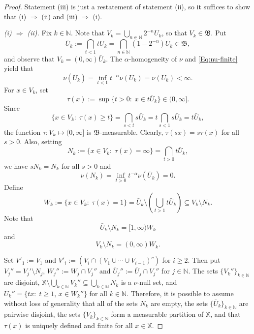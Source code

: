 \documentclass[12pt]{amsart}
\numberwithin{equation}{section}
\numberwithin{figure}{section}
\theoremstyle{plain} \newtheorem{theorem}{Theorem}[section]
\theoremstyle{plain} \newtheorem{proposition}[theorem]{Proposition}
\theoremstyle{plain} \newtheorem{lemma}[theorem]{Lemma}
\theoremstyle{plain} \newtheorem{corollary}[theorem]{Corollary}
\theoremstyle{definition} \newtheorem{definition}[theorem]{Definition}
\theoremstyle{definition} \newtheorem{notation}[theorem]{Notation}
\theoremstyle{remark} \newtheorem{remark}[theorem]{Remark}
\theoremstyle{remark} \newtheorem{example}[theorem]{Example}
\theoremstyle{definition} \newtheorem{assumption}{Assumption}
\newcommand{\bN}{\mathbb{N}}
\newcommand{\bX}{\mathbb{X}}
\newcommand{\salg}{\mathfrak{B}}
\begin{document}
\begin{proof}
  Statement (iii) is just a restatement of statement (ii), so it
  suffices to show that (i) $\Longrightarrow$ (ii) and (iii)
  $\Longrightarrow$ (i).

  \textsl{(i) $\Longrightarrow$ (ii).}  Fix $k\in\bN$. Note that
  $V_k=\bigcup_{n\in\bN} 2^{-n} U_k$, so that $V_k\in\salg$.  Put
  \begin{displaymath}
    \bar U_k:=\bigcap_{t<1} t U_k
    = \bigcap_{n \in \bN} (1 - 2^{-n}) U_k \in\salg,
  \end{displaymath}
  and observe that $V_k=(0,\infty) \bar U_k$.  The $\alpha$-homogeneity of
  $\nu$ and \eqref{Eq:nu-finite} yield that
  \begin{displaymath}
    \nu(\bar U_k)= \inf_{t<1} t^{-\alpha}\nu(U_k)=\nu(U_k)<\infty.
  \end{displaymath}
  For $x\in V_k$, set
  \begin{displaymath}
    \tau(x):=\sup\{t>0:\; x\in t\bar U_k\} \in (0,\infty]. 
  \end{displaymath}
  Since
  \begin{displaymath}
    \{x\in V_k:\; \tau(x)\geq t\}=\bigcap_{s<t} s\bar U_k
    = t \bigcap_{s<1}s\bar U_k = t\bar U_k,
  \end{displaymath}
  the function $\tau: V_k\mapsto (0,\infty]$ is
  $\salg$-measurable. Clearly, $\tau(sx)=s\tau(x)$ for all $s>0$.
  Also, setting
  \begin{displaymath}
    N_k := \{x\in V_k:\; \tau(x)=\infty\} = \bigcap_{t > 0} t \bar U_k,
  \end{displaymath}
  we have $s N_k = N_k$ for all $s > 0$ and
  \begin{displaymath}
    \nu(N_k)
    =\inf_{t>0} t^{-\alpha}\nu(\bar U_k)=0. 
  \end{displaymath}
  Define 
  \begin{displaymath}
    W_k:=\{x\in V_k:\; \tau(x)=1\} 
    = \bar U_k \setminus \left(\bigcup_{t > 1} t \bar U_k\right)
    \subseteq V_k \setminus N_k.
  \end{displaymath}
  Note that
  \begin{equation}
    \label{barU_k_minus_N_k_is_product}
    \bar U_k \setminus N_k = [1,\infty) W_k
  \end{equation}
  and
  \begin{equation}
    \label{V_k_minus_N_k_is_product}
    V_k \setminus N_k = (0,\infty) W_k.
  \end{equation}
  
  Set $V'_1:=V_1$ and $V'_i:= (V_i\cap (V_1\cup\cdots\cup V_{i-1})^c)$
  for $i\geq 2$. Then put $V_j'' = V_j' \setminus N_j$, $W_j''
  :=W_j\cap V_j''$ and $\bar U_j'':=\bar U_j \cap V_j''$ for
  $j\in\bN$. The sets $\{V_k''\}_{k\in\bN}$ are disjoint, $\bX
  \setminus \bigcup_{k \in \bN} V_k'' \subseteq \bigcup_{k \in \bN}
  N_k$ is a $\nu$-null set, and $\bar U_k''=\{tx:\; t\geq1,\, x \in
  W_k''\}$ for all $k\in\bN$. Therefore, it is possible to assume
  without loss of generality that all of the sets $N_k$ are empty, the
  sets $\{\bar U_k\}_{k \in \bN}$ are pairwise disjoint, the sets
  $\{V_k\}_{k\in\bN}$ form a measurable partition of $\bX$, and that
  $\tau(x)$ is uniquely defined and finite for all $x \in \bX$.


\end{proof}
\end{document}

